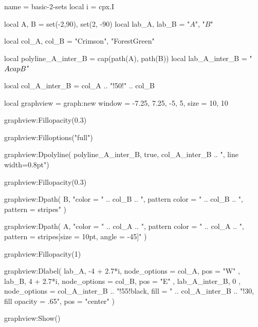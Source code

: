 \documentclass{standalone}
\begin{document}
\begin{luadraw}{name = basic-2-sets}
  local i = cpx.I

  local A, B = set(-2,90), set(2, -90)
  local lab_A, lab_B = "$A$", "$B$"

  local col_A, col_B = "Crimson", "ForestGreen"

  local polyline_A_inter_B = cap(path(A), path(B))
  local lab_A_inter_B = "$A \\cap B$"

  local col_A_inter_B = col_A .. "!50!" .. col_B

  local graphview = graph:new{
    window = {-7.25, 7.25, -5, 5},
    size   = {10, 10}
  }

  graphview:Fillopacity(0.3)

  graphview:Filloptions("full")

  graphview:Dpolyline(
    polyline_A_inter_B,
    true,
    col_A_inter_B .. ", line width=0.8pt")

  graphview:Fillopacity(0.3)

  graphview:Dpath(
    B,
      "color = "
    .. col_B
    .. ", pattern color = "
    .. col_B
    .. ", pattern = stripes"
  )

  graphview:Dpath(
    A,
      "color = "
    .. col_A
    .. ", pattern color = "
    .. col_A
    .. ", pattern = {stripes[size = 10pt, angle = -45]}"
  )

  graphview:Fillopacity(1)

  graphview:Dlabel(
    lab_A, -4 + 2.7*i, {
      node_options = col_A,
      pos = "W"
    },
    lab_B, 4 + 2.7*i, {
      node_options = col_B,
      pos = "E"
    },
    lab_A_inter_B, 0 , {
      node_options =  col_A_inter_B 
                   .. "!55!black, fill = "
                   .. col_A_inter_B 
                   .. "!30, fill opacity = .65",
      pos = "center"
     })

  graphview:Show()
\end{luadraw}
\end{document}
